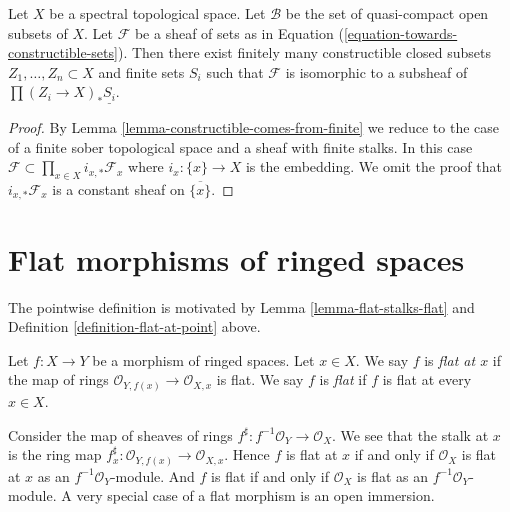 \begin{lemma}
\label{lemma-constructible-in-constant}
Let $X$ be a spectral topological space. Let $\mathcal{B}$ be
the set of quasi-compact open subsets of $X$.
Let $\mathcal{F}$ be a sheaf of sets as in
Equation (\ref{equation-towards-constructible-sets}).
Then there exist finitely many constructible closed subsets
$Z_1, \ldots, Z_n \subset X$ and finite sets $S_i$
such that $\mathcal{F}$ is isomorphic to a subsheaf of
$\prod (Z_i \to X)_*\underline{S_i}$.
\end{lemma}

\begin{proof}
By Lemma \ref{lemma-constructible-comes-from-finite}
we reduce to the case of a finite sober topological space
and a sheaf with finite stalks.
In this case $\mathcal{F} \subset \prod_{x \in X} i_{x, *}\mathcal{F}_x$
where $i_x : \{x\} \to X$ is the embedding. We omit the proof
that $i_{x, *}\mathcal{F}_x$ is a constant sheaf on $\overline{\{x\}}$.
\end{proof}










\section{Flat morphisms of ringed spaces}
\label{section-flat-morphisms}

\noindent
The pointwise definition is motivated by
Lemma \ref{lemma-flat-stalks-flat}
and
Definition \ref{definition-flat-at-point}
above.

\begin{definition}
\label{definition-flat-morphism}
Let $f : X \to Y$ be a morphism of ringed spaces.
Let $x \in X$. We say $f$ is {\it flat at $x$}
if the map of rings $\mathcal{O}_{Y, f(x)} \to \mathcal{O}_{X, x}$ is flat.
We say $f$ is {\it flat} if $f$ is flat at every $x \in X$.
\end{definition}

\noindent
Consider the map of sheaves of rings
$f^\sharp : f^{-1}\mathcal{O}_Y \to \mathcal{O}_X$.
We see that the stalk at $x$ is the ring map
$f^\sharp_x : \mathcal{O}_{Y, f(x)} \to \mathcal{O}_{X, x}$.
Hence $f$ is flat at $x$ if and only if $\mathcal{O}_X$ is flat at $x$
as an $f^{-1}\mathcal{O}_Y$-module. And $f$ is flat if and only if
$\mathcal{O}_X$ is flat as an $f^{-1}\mathcal{O}_Y$-module.
A very special case of a flat morphism is an open immersion.

